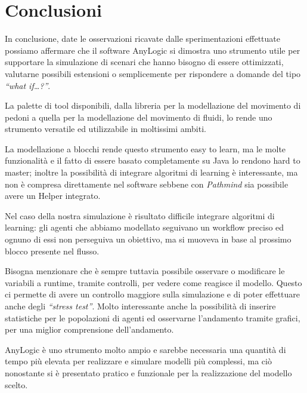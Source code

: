 \chapter{Conclusioni}

In conclusione, date le osservazioni ricavate dalle sperimentazioni effettuate possiamo affermare che il software AnyLogic si dimostra uno strumento utile per supportare la simulazione di scenari che hanno bisogno di essere ottimizzati, valutarne possibili estensioni o semplicemente per rispondere a domande del tipo \textit{“what if…?”}.


La palette di tool disponibili, dalla libreria per la modellazione del movimento di pedoni a quella per la modellazione del movimento di fluidi, lo rende uno strumento versatile ed utilizzabile in moltissimi ambiti. 

La modellazione a blocchi rende questo strumento easy to learn, ma le molte funzionalità e il fatto di essere basato completamente su Java lo rendono hard to master; inoltre la possibilità di integrare algoritmi di learning è interessante, ma non è compresa direttamente nel software sebbene con \textit{Pathmind} sia possibile avere un Helper integrato. 

Nel caso della nostra simulazione è risultato difficile integrare algoritmi di learning: gli agenti che abbiamo modellato seguivano un workflow preciso ed ognuno di essi non perseguiva un obiettivo, ma si muoveva in base al prossimo blocco presente nel flusso. 

Bisogna menzionare che è sempre tuttavia possibile osservare o modificare le variabili a runtime, tramite controlli, per vedere come reagisce il modello. Questo ci permette di avere un controllo maggiore sulla simulazione e di poter effettuare anche degli \textit{“stress test”}.
Molto interessante anche la possibilità di inserire statistiche per le popolazioni di agenti ed osservarne l’andamento tramite grafici, per una miglior comprensione dell'andamento. 

AnyLogic è uno strumento molto ampio e sarebbe necessaria una quantità di tempo più elevata per realizzare e simulare modelli più complessi, ma ciò nonostante si è  presentato pratico e funzionale per la realizzazione del modello scelto.